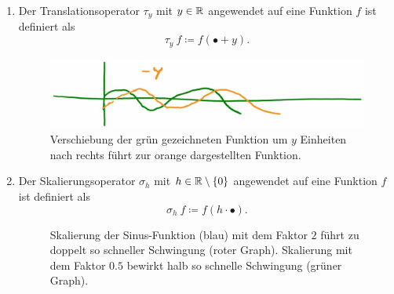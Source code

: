 \begin{definition} \leavevmode
\begin{enumerate}
\item Der Translationsoperator $ \tau_{y} $ mit $ y \in \mathbb{R} $ angewendet auf eine Funktion $ f $ ist 
definiert als
\[ \tau_{y} \ f \coloneqq f(\bullet + y). \]
\begin{figure}[h]
	\centering
	\includegraphics[width=0.5\linewidth]{Bilder/translation}
	\caption{Verschiebung der grün gezeichneten Funktion um $ y $ Einheiten nach rechts führt zur
  	orange dargestellten Funktion.}
	\label{fig:translation}
\end{figure}
\item Der Skalierungsoperator $ \sigma_{h} $ mit $ h \in \mathbb{R} \setminus \{ 0 \} $ angewendet auf eine 
Funktion $ f $ ist definiert als
\[ \sigma_{h} \ f \coloneqq f(h \cdot \bullet). \]
\begin{figure}[ht]
	\centering
	\caption{Skalierung der Sinus-Funktion (blau) mit dem Faktor $ 2 $ führt zu doppelt so schneller
  	Schwingung (roter Graph). Skalierung mit dem Faktor $ 0.5 $ bewirkt halb so schnelle
  	Schwingung (grüner Graph).}
	\label{fig:skalierung}
\end{figure}
\end{enumerate}
\end{definition}

